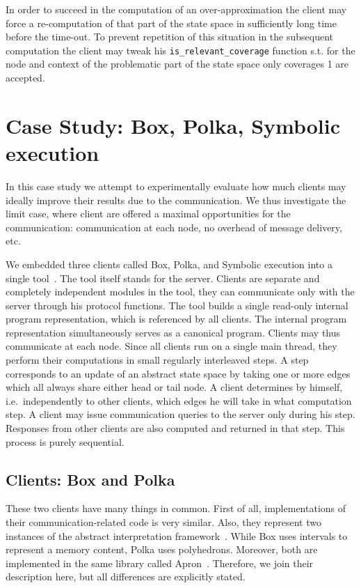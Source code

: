 \documentclass[envcountsame]{llncs}
\begin{document}
In order to succeed in the computation of an over-approximation the client may
force a re-computation of that part of the state space in sufficiently long time
before the time-out. To prevent repetition of this situation in the subsequent
computation the client may tweak his \texttt{is\_relevant\_coverage} function
s.t. for the node and context of the problematic part of the state space only
coverages 1 are accepted.


\section{Case Study: Box, Polka, Symbolic execution}
\label{sec:CaseStudy}

In this case study we attempt to experimentally evaluate how much clients may
ideally improve their results due to the communication. We thus investigate the
limit case, where client are offered a maximal opportunities for the
communication: communication at each node, no overhead of message delivery, etc.

We embedded three clients called Box, Polka, and Symbolic execution into a
single tool~\cite{StatorURL}. The tool itself stands for the server.
Clients are separate and completely independent modules in the tool, they can
communicate only with the server through his protocol functions. The tool builds
a single read-only internal program representation, which is referenced by all
clients. The internal program representation simultaneously serves as a
canonical program. Clients may thus communicate at each node. Since all clients
run on a single main thread, they perform their computations in small regularly
interleaved steps. A step corresponds to an update of an abstract state space by
taking one or more edges which all always share either head or tail node. A
client determines by himself, i.e.~independently to other clients, which edges
he will take in what computation step. A client may issue communication queries
to the server only during his step. Responses from other clients are also
computed and returned in that step. This process is purely sequential.


\subsection{Clients: Box and Polka}
\label{sec:BoxPolka}

These two clients have many things in common. First of all, implementations of
their communication-related code is very similar. Also, they represent two
instances of the abstract interpretation framework~\cite{AI_CousotCousot77}.
While Box uses intervals to represent a memory content, Polka uses polyhedrons.
Moreover, both are implemented in the same library called Apron~\cite{ApronURL}.
Therefore, we join their description here, but all differences are explicitly
stated.
\end{document}
